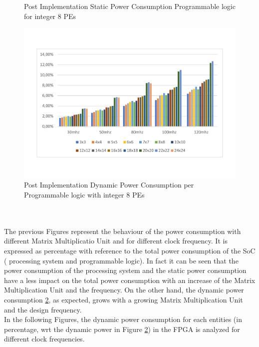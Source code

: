 \begin{itemize}
\begin{figure}[!htbp]
\caption{Post Implementation Static Power Consumption Programmable logic for integer 8 PEs }
\label{fig:staticpowint8}
\end{figure}
\begin{figure}[!htbp]
\centering
\captionsetup{justification=centering}
\includegraphics[scale=0.45,angle=0]{./figure/graphs/power_pldyn_int8_freq.pdf}
\caption{Post Implementation Dynamic Power Consumption per Programmable logic with integer 8 PEs}
\label{fig:dynpowint8}
\end{figure}\\\\
The previous Figures represent the behaviour of the power consumption with different Matrix Multiplicatio Unit and for different clock frequency. It is expressed as percentage with reference to the total power consumption of the SoC ( processing system and programmable logic). In fact it can be seen that the power consumption of the processing system and the static power consumption have a less impact on the total power consumption with an increase of the Matrix Multiplication Unit and the frequency. On the other hand, the dynamic power consumption \ref{fig:dynpowint8}, as expected, grows with a growing Matrix Multiplication Unit and the design frequency.\\
In the following Figures, the dynamic power consumption for each entities (in percentage, wrt the dynamic power in Figure \ref{fig:dynpowint8}) in the FPGA is analyzed for different clock frequencies.\\
\begin{figure}[!htbp]
\centering
\captionsetup{justification=centering}

\end{figure}
\end{itemize}
